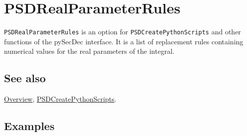 \documentclass[../FeynHelpersManual.tex]{subfiles}
\begin{document}
\hypertarget{psdrealparameterrules}{
\section{PSDRealParameterRules}\label{psdrealparameterrules}}

\texttt{PSDRealParameterRules} is an option for
\texttt{PSDCreatePythonScripts} and other functions of the pySecDec
interface. It is a list of replacement rules containing numerical values
for the real parameters of the integral.

\subsection{See also}

\hyperlink{toc}{Overview},
\hyperlink{psdcreatepythonscripts}{PSDCreatePythonScripts}.

\subsection{Examples}
\end{document}
